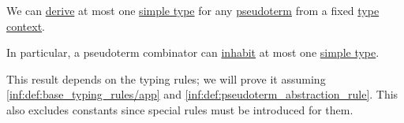 \begin{proposition}\label{thm:pseudoterm_uniqueness}
  We can \hyperref[def:simple_type_derivability]{derive} at most one \hyperref[def:simple_type]{simple type} for any \hyperref[def:pseudoterm]{pseudoterm} from a fixed \hyperref[def:type_context]{type context}.
\end{proposition}
\begin{comments}
  \item In particular, a pseudoterm combinator can \hyperref[def:type_habitation]{inhabit} at most one \hyperref[def:simple_type]{simple type}.

  \item This result depends on the typing rules; we will prove it assuming \ref{inf:def:base_typing_rules/app} and \ref{inf:def:pseudoterm_abstraction_rule}. This also excludes constants since special rules must be introduced for them.
\end{comments}
